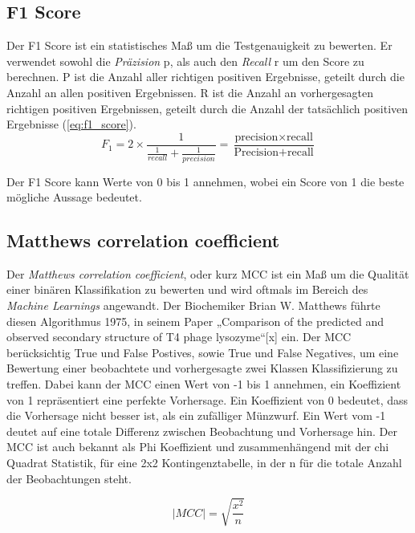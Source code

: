 \subsection{F1 Score}
Der F1 Score ist ein statistisches Maß um die Testgenauigkeit zu bewerten. Er verwendet sowohl die \emph{Präzision} p, als auch den \emph{Recall} r um den Score zu berechnen. P ist die Anzahl aller richtigen positiven Ergebnisse, geteilt durch die Anzahl an allen positiven Ergebnissen. R ist die Anzahl an vorhergesagten richtigen positiven Ergebnissen, geteilt durch die Anzahl der tatsächlich positiven Ergebnisse (\ref{eq:f1_score}). 
\begin{equation}
    F_{1} = 2 \times \frac{1}{\frac{1}{recall}+\frac{1}{precision}} = \frac{\text{precision} \times \text{recall}}{\text{Precision} + \text{recall}}
    \label{eq:f1_score}
\end{equation}

Der F1 Score kann Werte von 0 bis 1 annehmen, wobei ein Score von 1 die beste mögliche Aussage bedeutet.


\subsection{Matthews correlation coefficient}

Der \emph{Matthews correlation coefficient}, oder kurz MCC ist ein Maß um die Qualität einer binären Klassifikation zu bewerten und wird oftmals im Bereich des \emph{Machine Learnings} angewandt. Der Biochemiker Brian W. Matthews führte diesen Algorithmus 1975, in seinem Paper „Comparison of the predicted and observed secondary structure of T4 phage lysozyme“[x] ein. Der MCC berücksichtig True und False Postives, sowie True und False Negatives, um eine Bewertung einer beobachtete und vorhergesagte zwei Klassen Klassifizierung zu treffen. Dabei kann der MCC einen Wert von -1 bis 1 annehmen, ein Koeffizient von 1 repräsentiert eine perfekte Vorhersage. Ein Koeffizient von 0 bedeutet, dass die Vorhersage nicht besser ist, als ein zufälliger Münzwurf. Ein Wert vom -1 deutet auf eine totale Differenz zwischen Beobachtung und Vorhersage hin. Der MCC ist auch bekannt als Phi Koeffizient und zusammenhängend mit der chi Quadrat Statistik, für eine 2x2 Kontingenztabelle, in der n für die totale Anzahl der Beobachtungen steht.

\begin{equation}
    |MCC| = \sqrt{\frac{x^2}{n}}
    \label{eq:mcc}
\end{equation}

